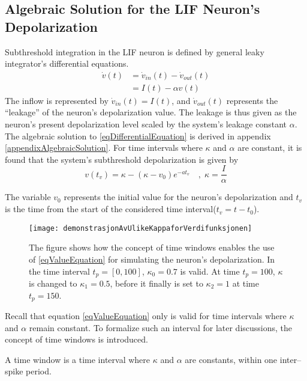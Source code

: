 	\subsection{Algebraic Solution for the LIF Neuron's Depolarization}
	\label{ssecTheAlgebraicSolution}
		Subthreshold integration in the LIF neuron is defined by general leaky integrator's differential equations\cite{gerstnerKistler2002KAP04}.
		\begin{equation}
			\begin{split}
				\dot{v}(t)&= \dot{v}_{in}(t) - \dot{v}_{out}(t) \\
					&= I(t) - \alpha v(t)
			\end{split}
			\label{eqDifferentialEquation}
		\end{equation}
		The inflow is represented by $\dot{v}_{in}(t) = I(t)$, and $\dot{v}_{out}(t)$ represents the ``leakage'' of the neuron's depolarization value.
		The leakage is thus given as the neuron's present depolarization level scaled by the system's leakage constant $\alpha$.
		The algebraic solution to \ref{eqDifferentialEquation} is derived in appendix \ref{appendixAlgebraicSolution}.
		For time intervals where $\kappa$ and $\alpha$ are constant, it is found that the system's subthreshold depolarization is given by %
		\begin{equation}
			v(t_v) = \kappa - \left( \kappa - v_0 \right) e^{-at_v} 	\quad,\; \kappa = \frac{I}{\alpha} %
			\label{eqValueEquation}
		\end{equation}

		The variable $v_0$ represents the initial value for the neuron's depolarization and $t_v$ is the time from the start of the considered time interval\mbox{($t_v = t - t_0$)}.
\begin{figure}[htb!p]
    \centering
    \texttt{[image: demonstrasjonAvUlikeKappaforVerdifunksjonen]}
 	  \caption[Illustration of how time windows can be utilized to simulated the neuron by the algebraic equation]{
			The figure shows how the concept of time windows enables the use of \eqref{eqValueEquation} for simulating the neuron's depolarization.
			In the time interval $t_p = [0, 100]$, $\kappa_0 = 0.7$ is valid.
			At time $t_p = 100$, $\kappa$ is changed to $\kappa_1 = 0.5$, before it finally is set to $\kappa_2 = 1$ at time $t_p = 150$.
			}
\end{figure}
		Recall that equation \ref{eqValueEquation} only is valid for time intervals where $\kappa$ and $\alpha$ remain constant.
		To formalize such an interval for later discussions, the concept of time windows is introduced. %
		\begin{mydef}
			A time window is a time interval where $\kappa$ and $\alpha$ are constants, within one inter--spike period.
			\label{defTimeWindow}
		\end{mydef}

